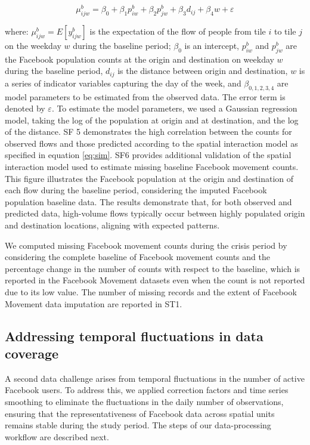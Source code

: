 \documentclass[fleqn,10pt]{wlscirep}
\begin{document}
\begin{equation}\label{eq:sim}
\mu^b_{ijw} = \beta_0 + \beta_1p^b_{iw} +\beta_2p^b_{jw} + \beta_3d_{ij} + \beta_4w + \varepsilon
\end{equation}

where: $\mu^b_{ijw} = E[y^b_{ijw}]$ is the expectation of the flow of people from tile $i$ to tile $j$ on the weekday $w$ during the baseline period; $\beta_0$ is an intercept, $p^b_{iw}$ and $p^b_{jw}$ are the Facebook population counts at the origin and destination on weekday $w$ during the baseline period, $d_{ij}$ is the distance between origin and destination, $w$ is a series of indicator variables capturing the day of the week, and $\beta_{0,1,2,3,4}$ are model parameters to be estimated from the observed data.
The error term is denoted by $\varepsilon$.
To estimate the model parameters, we used a Gaussian regression model, taking the log of the population at origin and at destination, and the log of the distance. SF 5 demonstrates the high correlation between the counts for observed flows and those predicted according to the spatial interaction model as specified in equation \eqref{eq:sim}. SF6 provides additional validation of the spatial interaction model used to estimate missing baseline Facebook movement counts. This figure illustrates the Facebook population at the origin and destination of each flow during the baseline period, considering the imputed Facebook population baseline data. The results demonstrate that, for both observed and predicted data, high-volume flows typically occur between highly populated origin and destination locations, aligning with expected patterns.

We computed missing Facebook movement counts during the crisis period by considering the complete baseline of Facebook movement counts and the percentage change in the number of counts with respect to the baseline, which is reported in the Facebook Movement datasets even when the count is not reported due to its low value. The number of missing records and the extent of Facebook Movement data imputation are reported in ST1.

\subsection*{Addressing temporal fluctuations in data coverage}

A second data challenge arises from temporal fluctuations in the number of active Facebook users. To address this, we applied correction factors and time series smoothing to eliminate the fluctuations in the daily number of observations, ensuring that the representativeness of Facebook data across spatial units remains stable during the study period. The steps of our data-processing workflow are described next.
\end{document}

